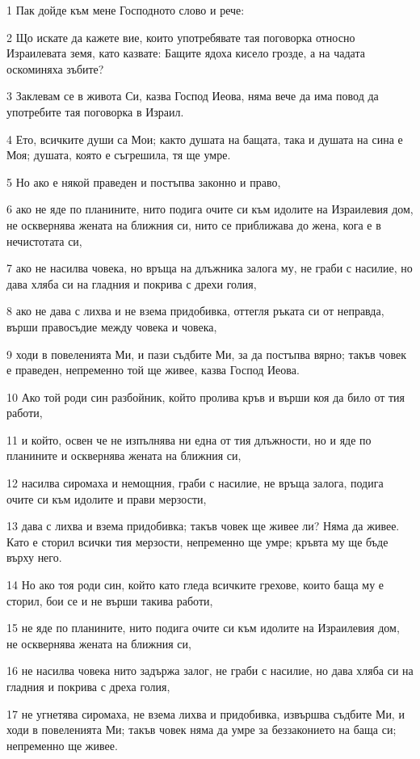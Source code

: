 \par 1 Пак дойде към мене Господното слово и рече:
\par 2 Що искате да кажете вие, които употребявате тая поговорка относно Израилевата земя, като казвате: Бащите ядоха кисело грозде, а на чадата оскоминяха зъбите?
\par 3 Заклевам се в живота Си, казва Господ Иеова, няма вече да има повод да употребите тая поговорка в Израил.
\par 4 Ето, всичките души са Мои; както душата на бащата, така и душата на сина е Моя; душата, която е съгрешила, тя ще умре.
\par 5 Но ако е някой праведен и постъпва законно и право,
\par 6 ако не яде по планините, нито подига очите си към идолите на Израилевия дом, не осквернява жената на ближния си, нито се приближава до жена, кога е в нечистотата си,
\par 7 ако не насилва човека, но връща на длъжника залога му, не граби с насилие, но дава хляба си на гладния и покрива с дрехи голия,
\par 8 ако не дава с лихва и не взема придобивка, оттегля ръката си от неправда, върши правосъдие между човека и човека,
\par 9 ходи в повеленията Ми, и пази съдбите Ми, за да постъпва вярно; такъв човек е праведен, непременно той ще живее, казва Господ Иеова.
\par 10 Ако той роди син разбойник, който пролива кръв и върши коя да било от тия работи,
\par 11 и който, освен че не изпълнява ни една от тия длъжности, но и яде по планините и осквернява жената на ближния си,
\par 12 насилва сиромаха и немощния, граби с насилие, не връща залога, подига очите си към идолите и прави мерзости,
\par 13 дава с лихва и взема придобивка; такъв човек ще живее ли? Няма да живее. Като е сторил всички тия мерзости, непременно ще умре; кръвта му ще бъде върху него.
\par 14 Но ако тоя роди син, който като гледа всичките грехове, които баща му е сторил, бои се и не върши такива работи,
\par 15 не яде по планините, нито подига очите си към идолите на Израилевия дом, не осквернява жената на ближния си,
\par 16 не насилва човека нито задържа залог, не граби с насилие, но дава хляба си на гладния и покрива с дреха голия,
\par 17 не угнетява сиромаха, не взема лихва и придобивка, извършва съдбите Ми, и ходи в повеленията Ми; такъв човек няма да умре за беззаконието на баща си; непременно ще живее.
